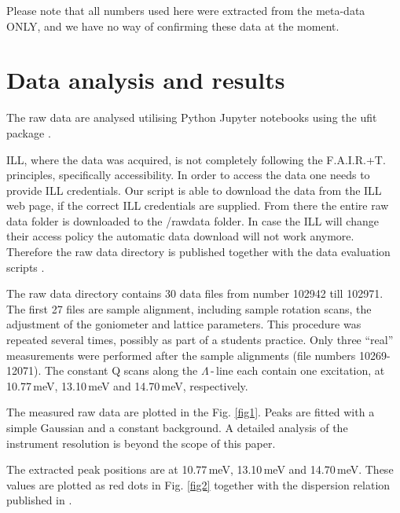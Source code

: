 \documentclass[aps,pra,reprint,amsmath,amssymb,superscriptaddress,showkeys]{revtex4-1}
\begin{document}
Please note that all numbers used here were extracted from the meta-data ONLY, and we have no way of confirming these data at the moment. 


\section{Data analysis and results}

The raw data are analysed utilising Python Jupyter notebooks \cite{jupyter} using the ufit package \cite{ufit}.

ILL, where the data was acquired, is not completely following the F.A.I.R.+T. principles, specifically accessibility. 
In order to access the data one needs to provide ILL credentials. 
Our script is able to download the data from the ILL web page, if the correct ILL credentials are supplied. 
From there the entire raw data folder is downloaded to the /rawdata folder. 
In case the ILL will change their access policy the automatic data download will not work anymore. 
Therefore the raw data directory is published together with the data evaluation scripts \cite{data-evaluation}.

The raw data directory contains 30 data files from number 102942 till 102971. 
The first 27 files are sample alignment, including sample rotation scans, the adjustment of the goniometer and lattice parameters. 
This procedure was repeated several times, possibly as part of a students practice.
Only three ``real'' measurements were performed after the sample alignments (file numbers 10269-12071).
The constant Q scans along the $\Lambda$\,-\,line each contain one excitation, at 10.77\,meV, 13.10\,meV and 14.70\,meV, respectively. 

The measured raw data are plotted in the Fig. \ref{fig1}.
Peaks are fitted with a simple Gaussian and a constant background. A detailed analysis of the instrument resolution is beyond the scope of this paper.

The extracted peak positions are at 10.77\,meV, 13.10\,meV and 14.70\,meV.
These values are plotted as red dots in Fig. \ref{fig2} together with the dispersion relation published in \cite{Aouissi}.
\end{document}
